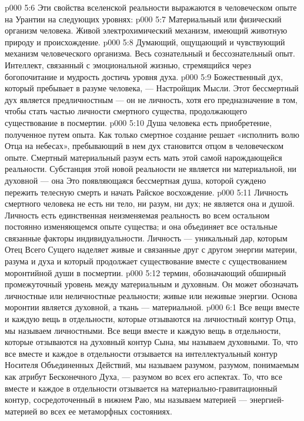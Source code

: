 \vs p000 5:6 \pc Эти свойства вселенской реальности выражаются в человеческом опыте на Урантии на следующих уровнях:
\vs p000 5:7 \bibnobreakspace {} Материальный или физический организм человека. Живой электрохимический механизм, имеющий животную природу и происхождение.
\vs p000 5:8 \bibnobreakspace {} Думающий, ощущающий и чувствующий механизм человеческого организма. Весь сознательный и бессознательный опыт. Интеллект, связанный с эмоциональной жизнью, стремящийся через богопочитание и мудрость достичь уровня духа.
\vs p000 5:9 \bibnobreakspace {} Божественный дух, который пребывает в разуме человека, --- Настройщик Мысли. Этот бессмертный дух является предличностным --- он не личность, хотя его предназначение в том, чтобы стать частью личности смертного существа, продолжающего существование в посмертии.
\vs p000 5:10 \bibnobreakspace {} Душа человека есть приобретение, полученное путем опыта. Как только смертное создание решает «исполнить волю Отца на небесах», пребывающий в нем дух становится отцом  в человеческом опыте. Смертный материальный разум есть мать этой самой нарождающейся реальности. Субстанция этой новой реальности не является ни материальной, ни духовной --- она  Это появляющаяся бессмертная душа, которой суждено пережить телесную смерть и начать Райское восхождение.
\vs p000 5:11 \bibnobreakspace {} Личность смертного человека не есть ни тело, ни разум, ни дух; не является она и душой. Личность есть единственная неизменяемая реальность во всем остальном постоянно изменяющемся опыте существа; и она объединяет все остальные связанные факторы индивидуальности. Личность --- уникальный дар, которым Отец Всего Сущего наделяет живые и связанные друг с другом энергии материи, разума и духа и который продолжает существование вместе с существованием моронтийной души в посмертии.
\vs p000 5:12 \bibnobreakspace {} термин, обозначающий обширный промежуточный уровень между материальным и духовным. Он может обозначать личностные или неличностные реальности; живые или неживые энергии. Основа моронтии является духовной, а ткань --- материальной.
\vs p000 6:1 Все вещи вместе и каждую вещь в отдельности, которые отзываются на личностный контур Отца, мы называем личностными. Все вещи вместе и каждую вещь в отдельности, которые отзываются на духовный контур Сына, мы называем духовными. То, что все вместе и каждое в отдельности отзывается на интеллектуальный контур Носителя Объединенных Действий, мы называем разумом, разумом, понимаемым как атрибут Бесконечного Духа, --- разумом во всех его аспектах. То, что все вместе и каждое в отдельности отзывается на материально\hyp{}гравитационный контур, сосредоточенный в нижнем Раю, мы называем материей --- энергией\hyp{}материей во всех ее метаморфных состояниях.
